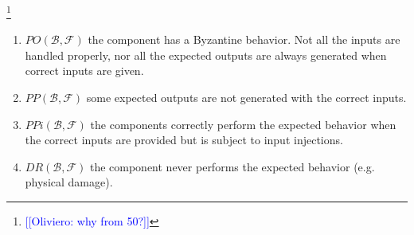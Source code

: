 \documentclass[runningheads]{llncs}
\newcommand{\beliefRegion}{\mathcal{B}}
\newcommand{\factRegion}{\mathcal{F}}
\newcommand{\pp}[2]{PP(#1,#2)}
\newcommand{\po}[2]{PO(#1,#2)}
\newcommand{\ppi}[2]{PPi(#1,#2)}
\newcommand{\dr}[2]{DR(#1,#2)}
\newcommand{\ON}[1]{\footnote{\textcolor{blue}{[[Oliviero: #1]]}}}
\begin{document}
\ON{why from 50?}

\begin{enumerate}[start=50, label={W\arabic*)}]
	\item $\po{\beliefRegion}{\factRegion}$ the component has a Byzantine
		behavior. Not all the inputs are handled properly,
		nor all the expected outputs are always generated when correct
		inputs are given.
	\item $\pp{\beliefRegion}{\factRegion}$ some expected outputs are not
	        generated with the correct
	        inputs.
	\item $\ppi{\beliefRegion}{\factRegion}$ the components
	        correctly perform the expected behavior when the correct
	        inputs are provided but is subject to input
	        injections.
	\item $\dr{\beliefRegion}{\factRegion}$ the component
		never performs the expected behavior (e.g. physical
		damage).
\end{enumerate}
\end{document}
